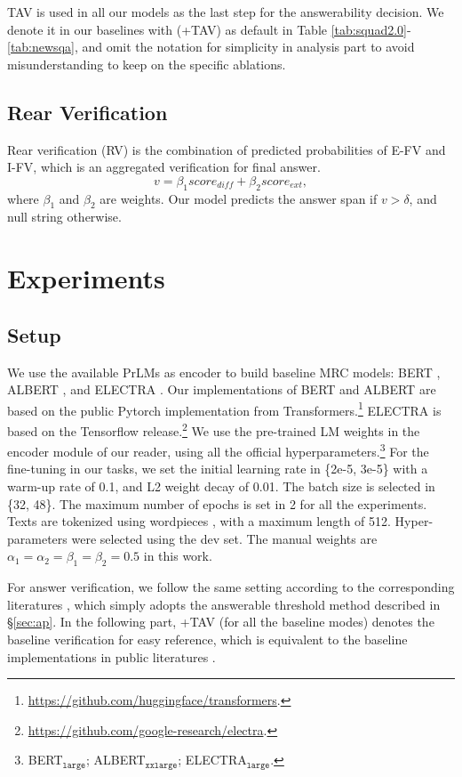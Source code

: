 \documentclass[letterpaper]{article} %
\begin{document}
TAV is used in all our models as the last step for the answerability  decision. We denote it in our baselines with (+TAV) as default in Table \ref{tab:squad2.0}-\ref{tab:newsqa}, and omit the notation for simplicity in analysis part to avoid misunderstanding to keep on the specific ablations.

\subsection{Rear Verification}
Rear verification (RV) is the combination of predicted probabilities of E-FV and I-FV, which is an aggregated verification for final answer. %
\begin{equation}
v = \beta_{1} score_{diff} + \beta_{2} score_{ext},
\end{equation}
where $\beta_{1}$ and $\beta_{2}$ are weights. Our model predicts the answer span if $v > \delta$, and null string otherwise.

\section{Experiments}
\subsection{Setup}
We use %
the available PrLMs as encoder to build baseline MRC models: BERT \cite{devlin2018bert}, ALBERT \cite{Lan2020ALBERT}, and ELECTRA \cite{clark2019electra}. Our implementations of BERT and ALBERT are based on the public Pytorch implementation from Transformers.\footnote{\url{https://github.com/huggingface/transformers}.} ELECTRA is based on the Tensorflow release.\footnote{\url{https://github.com/google-research/electra}.} We use the pre-trained LM weights in the encoder module of our reader, using all the official hyperparameters.\footnote{BERT$_\texttt{large}$; ALBERT$_\texttt{xxlarge}$; ELECTRA$_\texttt{large}$.} For the fine-tuning in our tasks, we set the initial learning rate in \{2e-5, 3e-5\} with a warm-up rate of 0.1, and L2 weight decay of 0.01. The batch size is selected in \{32, 48\}. The maximum number of epochs is set in 2 for all the experiments. Texts are tokenized using wordpieces \cite{wu2016google}, with a maximum length of 512. Hyper-parameters were selected using the dev set. The manual weights are  $\alpha_{1}=\alpha_{2}=\beta_{1}=\beta_{2}=0.5$ in this work.


For answer verification, %
we follow the same setting according to the corresponding literatures \cite{devlin2018bert,Lan2020ALBERT,clark2019electra}, which simply adopts the answerable threshold method described in \S\ref{sec:ap}. In the following part, +TAV (for all the baseline modes) denotes the baseline verification for easy reference, which is equivalent to the baseline implementations in public literatures \cite{devlin2018bert,Lan2020ALBERT,clark2019electra}.
\end{document}
